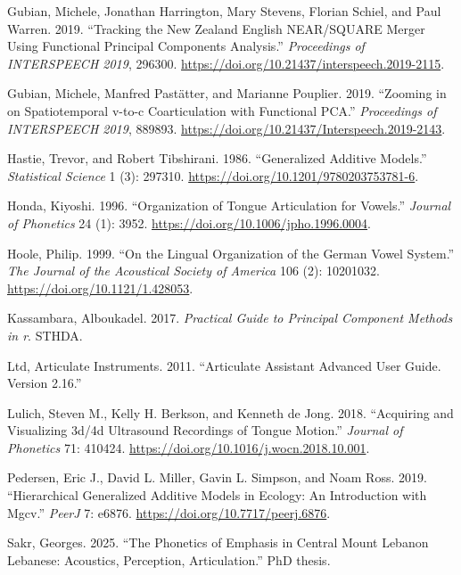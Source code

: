 \documentclass[
]{interact}
\newlength{\cslhangindent}
\newenvironment{CSLReferences}[2] %
 {\begin{list}{}{%
  \setlength{\itemindent}{0pt}
  \setlength{\leftmargin}{0pt}
  \setlength{\parsep}{0pt}
  \ifodd #1
   \setlength{\leftmargin}{\cslhangindent}
   \setlength{\itemindent}{-1\cslhangindent}
  \fi
  \setlength{\itemsep}{#2\baselineskip}}}
 {\end{list}}
\begin{document}
\begin{CSLReferences}{1}{0}
Gubian, Michele, Jonathan Harrington, Mary Stevens, Florian Schiel, and
Paul Warren. 2019. {``Tracking the New Zealand English NEAR/SQUARE
Merger Using Functional Principal Components Analysis.''}
\emph{Proceedings of INTERSPEECH 2019}, 296300.
\url{https://doi.org/10.21437/interspeech.2019-2115}.

Gubian, Michele, Manfred Pastätter, and Marianne Pouplier. 2019.
{``Zooming in on Spatiotemporal v-to-c Coarticulation with Functional
PCA.''} \emph{Proceedings of INTERSPEECH 2019}, 889893.
\url{https://doi.org/10.21437/Interspeech.2019-2143}.

Hastie, Trevor, and Robert Tibshirani. 1986. {``Generalized Additive
Models.''} \emph{Statistical Science} 1 (3): 297310.
\url{https://doi.org/10.1201/9780203753781-6}.

Honda, Kiyoshi. 1996. {``Organization of Tongue Articulation for
Vowels.''} \emph{Journal of Phonetics} 24 (1): 3952.
\url{https://doi.org/10.1006/jpho.1996.0004}.

Hoole, Philip. 1999. {``On the Lingual Organization of the German Vowel
System.''} \emph{The Journal of the Acoustical Society of America} 106
(2): 10201032. \url{https://doi.org/10.1121/1.428053}.

Kassambara, Alboukadel. 2017. \emph{Practical Guide to Principal
Component Methods in r}. STHDA.

Ltd, Articulate Instruments. 2011. {``Articulate Assistant Advanced User
Guide. {Version} 2.16.''}

Lulich, Steven M., Kelly H. Berkson, and Kenneth de Jong. 2018.
{``Acquiring and Visualizing 3d/4d Ultrasound Recordings of Tongue
Motion.''} \emph{Journal of Phonetics} 71: 410424.
\url{https://doi.org/10.1016/j.wocn.2018.10.001}.

Pedersen, Eric J., David L. Miller, Gavin L. Simpson, and Noam Ross.
2019. {``Hierarchical Generalized Additive Models in Ecology: An
Introduction with Mgcv.''} \emph{PeerJ} 7: e6876.
\url{https://doi.org/10.7717/peerj.6876}.

Sakr, Georges. 2025. {``The Phonetics of Emphasis in Central Mount
Lebanon Lebanese: Acoustics, Perception, Articulation.''} PhD thesis.


\end{CSLReferences}
\end{document}
